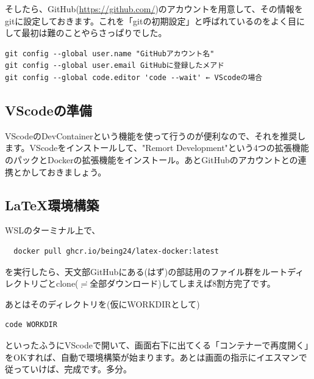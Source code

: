 \documentclass[../main]{subfiles}
\begin{document}
そしたら、GitHub(\url{https://github.com/})のアカウントを用意して、その情報をgitに設定しておきます。これを「gitの初期設定」と呼ばれているのをよく目にして最初は難のことやらさっぱりでした。
\begin{lstlisting}
git config --global user.name "GitHubアカウント名"
git config --global user.email GitHubに登録したメアド
git config --global code.editor 'code --wait' ← VScodeの場合
\end{lstlisting}
\subsection{VScodeの準備}
VScodeのDevContainerという機能を使って行うのが便利なので、それを推奨します。VScodeをインストールして、"Remort Development"という4つの拡張機能のパックとDockerの拡張機能をインストール。あとGitHubのアカウントとの連携とかしておきましょう。
\subsection{\LaTeX 環境構築}
WSLのターミナル上で、
\begin{lstlisting}
  docker pull ghcr.io/being24/latex-docker:latest
\end{lstlisting}
を実行したら、天文部GitHubにある(はず)の部誌用のファイル群をルートディレクトリごとclone($\risingdotseq$全部ダウンロード)してしまえば8割方完了です。

あとはそのディレクトリを(仮にWORKDIRとして)
\begin{lstlisting}
code WORKDIR
\end{lstlisting}
といったふうにVScodeで開いて、画面右下に出てくる「コンテナーで再度開く」をOKすれば、自動で環境構築が始まります。あとは画面の指示にイエスマンで従っていけば、完成です。多分。
\end{document}
